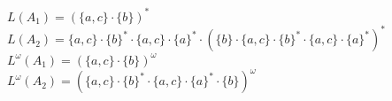 \documentclass[a4paper,12pt]{scrartcl}
\title{\blatt}
\date{Gruppe 06}
\author{Sabrina Buczko 6663234, Julian Deinert 6535880, Rafael Heid 6704828}
\begin{document}
\maketitle
\newpage
\setcounter{section}{2}
\section{}
\setcounter{subsection}{2}
\subsection{}
\subsubsection{}
$L(A_1)=(\{a,c\}\cdot\{b\})^*$\\
$L(A_2)=\{a,c\}\cdot\{b\}^* \cdot \{a,c\}\cdot \{a\}^* \cdot(\{b\}\cdot \{a,c\}\cdot\{b\}^* \cdot \{a,c\}\cdot \{a\}^*)^*$\\
$L^\omega (A_1)=(\{a,c\}\cdot\{b\})^\omega$\\
$L^\omega (A_2)=(\{a,c\}\cdot\{b\}^* \cdot \{a,c\}\cdot \{a\}^* \cdot\{b\})^\omega$

\subsubsection{}

\subsubsection{}

\subsection{}
\end{document}
